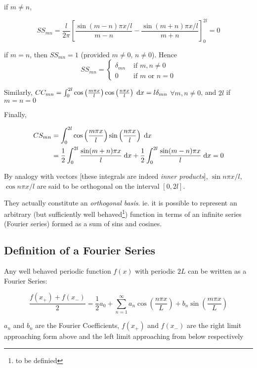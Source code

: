 \documentclass[a4paper]{article}
\begin{document}
if $ m \neq n $,

\[ SS_{mn} = \frac{l}{2 \pi} \left[  \frac{\sin (m-n)\pi x / l}{m - n} -  \frac{\sin (m+n)\pi x / l}{m + n} \right]_{0}^{2l} = 0  \]

if $ m = n $, then $  SS_{mn} = 1 $ (provided $ m \neq 0 $, $ n \neq 0 $). Hence
\[ SS_{mn} = \begin{cases} \delta_{mn}  & \text{ if }  m, n \neq 0 \\ 0 & \text{ if }   m \text{ or } n = 0\end{cases}  \]

Similarly, $ CC_{mn} = \int_{0}^{2l} \cos \left( \frac{m \pi x }{l} \right) \cos \left( \frac{n \pi x }{l} \right) \; \mathrm{d} x = l \delta_{mn} $
 $ \forall m,n \neq 0 $, and $ 2l $ if $ m = n = 0 $
 
Finally,

\begin{align*}
CS_{mn} & = \int_{0}^{2l} \cos \left( \frac{m \pi x }{l} \right) \sin \left( \frac{n \pi x }{l} \right) \; \mathrm{d} x  \\
& = \frac{1}{2} \int_{0}^{2l} \frac{\sin (m + n) \pi x }{l} \; \mathrm{d} x + \frac{1}{2} \int_{0}^{2l} \frac{\sin (m - n) \pi x }{l} \; \mathrm{d} x = 0
\end{align*}

By analogy with vectors [these integrals are indeed \emph{inner products}], $ \sin n \pi x / l $, $ \cos n \pi x / l $ are said to be orthogonal on the interval $ [0,2l] $.

They actually constitute an \emph{orthogonal basis}. ie. it is possible to represent an arbitrary (but sufficiently well behaved\footnote{to be definied}) function in terms of an infinite series (Fourier series) formed as a sum of sins and cosines. 


\subsection{Definition of a Fourier Series}

Any well behaved periodic function $ f(x) $ with periodic $ 2L $ can be written as a Fourier Series:

\[ \frac{f(x_{+}) + f(x_{-})}{2} = \frac{1}{2} a_{0} + \sum_{n=1}^{\infty} a_{n} \cos \left( \frac{n \pi x}{L} \right) + b_{n} \sin \left( \frac{m \pi x}{L} \right)   \] 

$ a_{n} $ and $ b_{n} $ are the Fourier Coefficients, $ f(x_{+}) $ and $ f(x_{-}) $ are the right limit approaching form above and the left limit approaching from below respectively 
\end{document}
